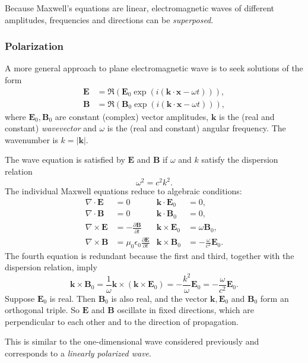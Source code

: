 \documentclass[12pt]{article}
\begin{document}
Because Maxwell's equations are linear, electromagnetic waves of different amplitudes, frequencies and directions can be \emph{superposed}.

\subsubsection{Polarization}
\label{subsub:polarization}

A more general approach to plane electromagnetic wave is to seek solutions of the form
\begin{align*}
	\mathbf{E} &= \Re (\mathbf{E}_0 \exp(i (\mathbf{k} \cdot \mathbf{x} - \omega t)) ), \\
	\mathbf{B} &= \Re (\mathbf{B}_0 \exp(i (\mathbf{k} \cdot \mathbf{x} - \omega t))),
\end{align*}
where $\mathbf{E}_0, \mathbf{B}_0$ are constant (complex) vector amplitudes, $\mathbf{k}$ is the (real and constant) \emph{wavevector} and $\omega$ is the (real and constant) angular frequency. The wavenumber is $k = |\mathbf{k}|$.

The wave equation is satisfied by $\mathbf{E}$ and $\mathbf{B}$ if $\omega$ and $k$ satisfy the dispersion relation
\[
\omega^2 = c^2 k^2.
\]
The individual Maxwell equations reduce to algebraic conditions:
\begin{align*}
	\nabla \cdot \mathbf{E} &= 0 &  \mathbf{k} \cdot \mathbf{E}_0 &= 0,\\
	\nabla \cdot \mathbf{B} &= 0 & \mathbf{k} \cdot \mathbf{B}_0 &= 0, \\
	\nabla \times \mathbf{E} &= - \frac{\partial \mathbf{B}}{\partial t} & \mathbf{k} \times \mathbf{E}_0 &= \omega \mathbf{B}_0, \\
	\nabla \times \mathbf{B} &= \mu_0 \epsilon_0 \frac{\partial \mathbf{E}}{\partial t} & \mathbf{k} \times \mathbf{B}_0 &= - \frac{\omega}{c^2} \mathbf{E}_0.
\end{align*}
The fourth equation is redundant because the first and third, together with the dispersion relation, imply
\[
\mathbf{k} \times \mathbf{B}_0 = \frac{1}{\omega} \mathbf{k} \times (\mathbf{k} \times \mathbf{E}_0) = - \frac{k^2}{\omega} \mathbf{E}_0 = - \frac{\omega}{c^2} \mathbf{E}_0.
\]
Suppose $\mathbf{E}_0$ is real. Then $\mathbf{B}_0$ is also real, and the vector $\mathbf{k}, \mathbf{E}_0$ and $\mathbf{B}_0$ form an orthogonal triple. So $\mathbf{E}$ and $\mathbf{B}$ oscillate in fixed directions, which are perpendicular to each other and to the direction of propagation.

This is similar to the one-dimensional wave considered previously and corresponds to a \emph{linearly polarized wave}.

\newpage

\printindex
\end{document}
